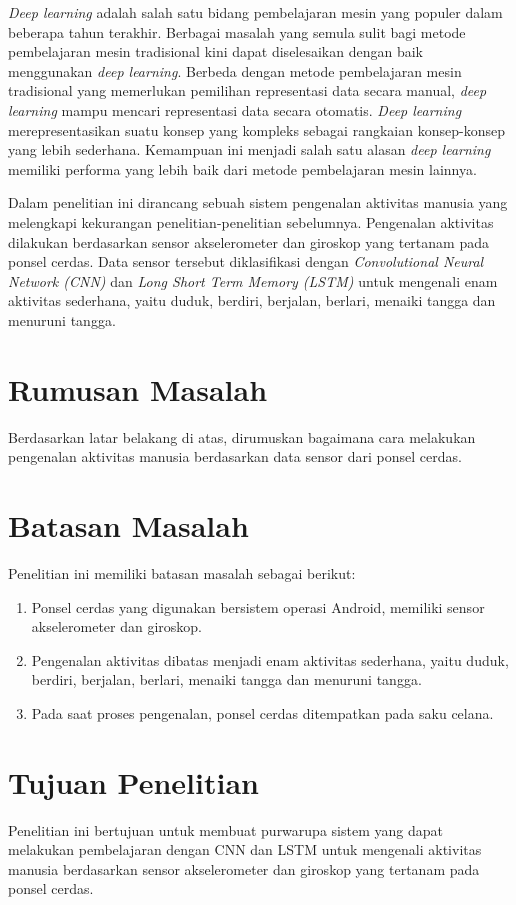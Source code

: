 \textit{Deep learning} adalah salah satu bidang pembelajaran mesin yang populer dalam beberapa tahun terakhir. Berbagai masalah yang semula sulit bagi metode pembelajaran mesin tradisional kini dapat diselesaikan dengan baik menggunakan \textit{deep learning}. Berbeda dengan metode pembelajaran mesin tradisional yang memerlukan pemilihan representasi data secara manual, \textit{deep learning} mampu mencari representasi data secara otomatis. \textit{Deep learning} merepresentasikan suatu konsep yang kompleks sebagai rangkaian konsep-konsep yang lebih sederhana. Kemampuan ini menjadi salah satu alasan \textit{deep learning} memiliki performa yang lebih baik dari metode pembelajaran mesin lainnya.

Dalam penelitian ini dirancang sebuah sistem pengenalan aktivitas manusia yang melengkapi kekurangan penelitian-penelitian sebelumnya. Pengenalan aktivitas dilakukan berdasarkan sensor akselerometer dan giroskop yang tertanam pada ponsel cerdas. Data sensor tersebut diklasifikasi dengan \textit{Convolutional Neural Network (CNN)} dan \textit{Long Short Term Memory (LSTM)} untuk mengenali enam aktivitas sederhana, yaitu duduk, berdiri, berjalan, berlari, menaiki tangga dan menuruni tangga.

\section{Rumusan Masalah}
Berdasarkan latar belakang di atas, dirumuskan bagaimana cara melakukan pengenalan aktivitas manusia berdasarkan data sensor dari ponsel cerdas.

\section{Batasan Masalah}
Penelitian ini memiliki batasan masalah sebagai berikut:

\begin{enumerate}
    \item Ponsel cerdas yang digunakan bersistem operasi Android, memiliki sensor akselerometer dan giroskop.
    \item Pengenalan aktivitas dibatas menjadi enam aktivitas sederhana, yaitu duduk, berdiri, berjalan, berlari, menaiki tangga dan menuruni tangga.
    \item Pada saat proses pengenalan, ponsel cerdas ditempatkan pada saku celana.
\end{enumerate}

\section{Tujuan Penelitian}
Penelitian ini bertujuan untuk membuat purwarupa sistem yang dapat melakukan pembelajaran dengan CNN dan LSTM untuk mengenali aktivitas manusia berdasarkan sensor akselerometer dan giroskop yang tertanam pada ponsel cerdas.

